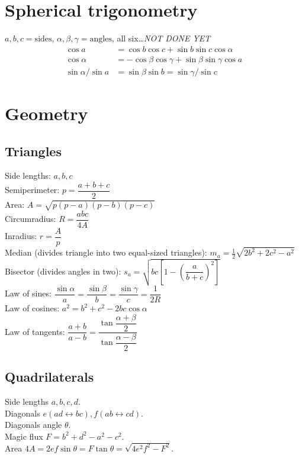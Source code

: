 \section{Spherical trigonometry}
$a,b,c=\text{sides}$, $\alpha,\beta,\gamma=\text{angles}$, all
six\ldots \emph{NOT DONE YET}
\begin{align*}
\cos a&{}=\cos b \cos c + \sin b \sin c \cos \alpha\\
\cos \alpha&{}=-\cos\beta \cos\gamma + \sin\beta\sin\gamma\cos a\\
\sin \alpha/\sin a&{}=\sin\beta\sin b=\sin\gamma/\sin c
\end{align*}

\section{Geometry}

\subsection{Triangles}
Side lengths: $a,b,c$\\
Semiperimeter: $p=\dfrac{a+b+c}{2}$\\
Area: $A=\sqrt{p(p-a)(p-b)(p-c)}$\\
Circumradius: $R=\dfrac{abc}{4A}$\\
Inradius: $r=\dfrac{A}{p}$\\
Median (divides triangle into two equal-sized triangles): $m_a=\tfrac{1}{2}\sqrt{2b^2+2c^2-a^2}$\\
Bisector (divides angles in two): $s_a=\sqrt{bc\left[1-\left(\dfrac{a}{b+c}\right)^2\right]}$\\
Law of sines: $\dfrac{\sin\alpha}{a}=\dfrac{\sin\beta}{b}=\dfrac{\sin\gamma}{c}=\dfrac{1}{2R}$\\
Law of cosines: $a^2=b^2+c^2-2bc\cos\alpha$\\
Law of tangents: $\dfrac{a+b}{a-b}=\dfrac{\tan\dfrac{\alpha+\beta}{2}}{\tan\dfrac{\alpha-\beta}{2}}$\\

\subsection{Quadrilaterals}
Side lengths $a,b,c,d$.\\
Diagonals $e(ad\leftrightarrow bc), f(ab\leftrightarrow cd)$.\\
Diagonals angle $\theta$.\\
Magic flux $F=b^2+d^2-a^2-c^2$.\\
Area $4A=2ef\sin\theta=F\tan\theta=\sqrt{4e^2f^2-F^2}$.

